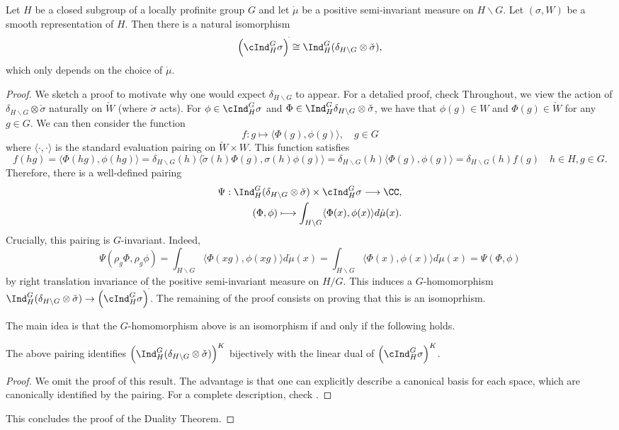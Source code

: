 \begin{thm}\label{thm:duality}
    Let $H$ be a closed subgroup of a locally profinite group $G$ and let $\dot{\mu}$ be a positive semi-invariant measure on $H\backslash G$. Let $(\sigma,W)$ be a smooth representation of $H$. Then there is a natural isomorphism
    $$\left(\cInd_H^G\sigma \right)^{\check{}}\cong \Ind_H^G(\delta_{H\backslash G}\otimes \check{\sigma}),$$
    which only depends on the choice of $\dot{\mu}$.
\end{thm}

\begin{proof}
    We sketch a proof to motivate why one would expect $\delta_{H\backslash G}$ to appear. For a detalied proof, check \cite[]{BH1}
    Throughout, we view the action of $\delta_{H\backslash G}\otimes\check{\sigma}$ naturally on $\check{W}$ (where $\check{\sigma}$ acts). For $\phi\in \cInd_H^G\sigma$ and $\Phi\in\Ind_H^G\delta_{H\backslash G}\otimes\check{\sigma}$, 
    we have that $\phi(g)\in W$ and $\Phi(g)\in\check{W}$ for any $g\in G$. We can then consider the function $$f:g\longmapsto\langle\Phi(g),\phi(g)\rangle,\quad g\in G $$ 
    where $\langle\cdot,\cdot\rangle$ is the standard evaluation pairing on $\check{W}\times W$. This function satisfies 
    $$f(hg)=\langle\Phi(hg),\phi(hg)\rangle=\delta_{H\backslash G}(h)\langle\check{\sigma}(h)\Phi(g),\sigma(h)\phi(g)\rangle=\delta_{H\backslash G}(h)\langle\Phi(g),\phi(g)\rangle=\delta_{H\backslash G}(h)f(g)\quad h\in H, g\in G.$$
    Therefore, there is a well-defined pairing 
    \begin{align*}
        \Psi:\Ind_H^G(\delta_{H\backslash G}\otimes\check{\sigma})\times \cInd_H^G\sigma\longrightarrow\CC&,\\
        (\Phi,\phi)\longmapsto\int_{H\backslash G}\langle\Phi(x),\phi(x)\rangle d\dot{\mu}(x)&.
    \end{align*}
    Crucially, this pairing is $G$-invariant. Indeed, 
    $$\Psi(\rho_g\Phi,\rho_g\phi)=\int_{H\backslash G}\langle\Phi(xg),\phi(xg)\rangle d\dot{\mu}(x)=\int_{H\backslash G}\langle\Phi(x),\phi(x)\rangle d\dot{\mu}(x)=\Psi(\Phi,\phi)$$
    by right translation invariance of the positive semi-invariant measure on $H/G$. 
    This induces a $G$-homomorphism $\Ind_H^G(\delta_{H\backslash G}\otimes \check{\sigma})\to \left(\cInd_H^G\sigma \right)^{\check{}}$. The remaining of the proof consists on proving that this is an isomoprhism.

    The main idea is that the $G$-homomorphism above is an isomorphism if and only if the following holds.
    \begin{lemma}
        The above pairing identifies $\left(\Ind_H^G(\delta_{H\backslash G}\otimes \check{\sigma})\right)^K$ bijectively with the linear dual of $\left(\cInd_H^G\sigma \right)^K$.
    \end{lemma}
    \begin{proof}
        We omit the proof of this result. The advantage is that one can explicitly describe a canonical basis for each space, which are canonically identified by the pairing. For a complete description, check \cite[3.5 Lemma 2]{BH1}.
    \end{proof}
    This concludes the proof of the Duality Theorem.
\end{proof}